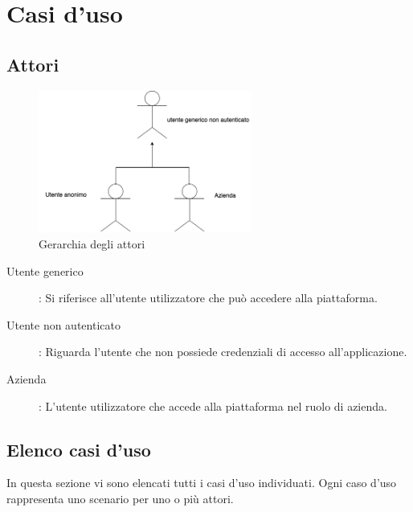 \section{Casi d'uso}

\subsection{Attori}
\begin{figure}[h]

\caption{Gerarchia degli attori}
\includegraphics[width=7cm]{section/images/utenti.png}
\centering

\end{figure}
\begin{description}
\item[Utente generico]:
Si riferisce all'utente utilizzatore che può accedere alla piattaforma.
\item[Utente non autenticato]:
Riguarda l'utente che non possiede credenziali di accesso all'applicazione.
\item[Azienda] :
L'utente utilizzatore che accede alla piattaforma nel ruolo di azienda.
\end{description}
\subsection{Elenco casi d'uso}
In questa sezione vi sono elencati tutti i casi d'uso individuati. Ogni caso d'uso rappresenta uno scenario per uno o più attori.